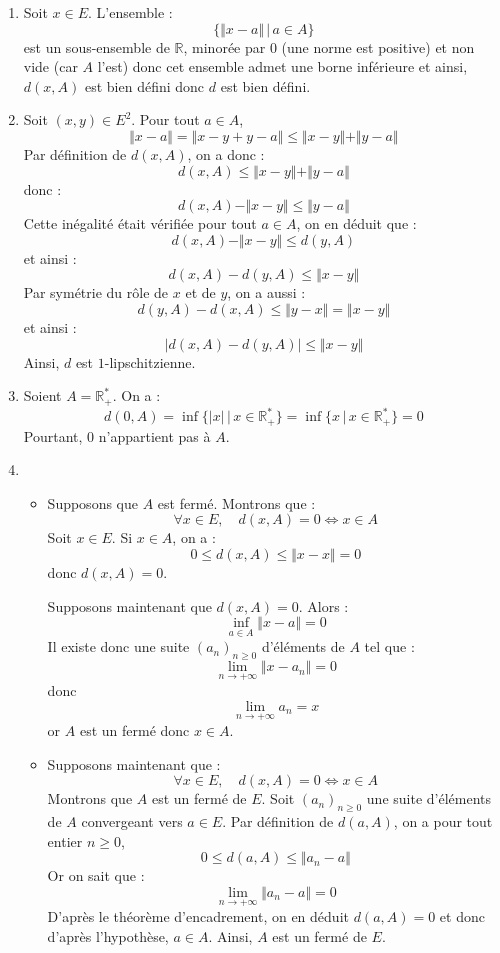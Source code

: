 \documentclass[a4paper,10pt]{report}
\begin{document}
\begin{enumerate}
\item Soit $x \in E$. L'ensemble :
$$ \lbrace \Vert x- a \Vert \, \vert \, a \in A \rbrace$$
est un sous-ensemble de $\mathbb{R}$, minorée par $0$ (une norme est positive) et non vide (car $A$ l'est) donc cet ensemble admet une borne inférieure et ainsi, $d(x,A)$ est bien défini donc $d$ est bien défini.
\item Soit $(x,y) \in E^2$. Pour tout $a \in A$,
$$ \Vert x-a \Vert = \Vert x-y+y-a \Vert \leq \Vert x-y \Vert + \Vert y-a \Vert$$
Par définition de $d(x,A)$, on a donc :
$$ d(x,A) \leq \Vert x-y \Vert + \Vert y-a \Vert$$
donc :
$$ d(x,A) - \Vert x-y \Vert \leq \Vert y-a \Vert$$
Cette inégalité était vérifiée pour tout $a \in A$, on en déduit que :
$$ d(x,A) - \Vert x-y \Vert \leq d(y,A)$$
et ainsi :
$$ d(x,A)-d(y,A) \leq \Vert x-y \Vert$$
Par symétrie du rôle de $x$ et de $y$, on a aussi :
$$  d(y,A)-d(x,A) \leq \Vert y-x \Vert = \Vert x-y \Vert$$
et ainsi :
$$ \vert d(x,A)-d(y,A) \vert \leq \Vert x-y \Vert$$
Ainsi, $d$ est $1$-lipschitzienne.
\item Soient $A= \mathbb{R}_+^{*}$. On a :
$$ d(0,A) = \inf \lbrace \vert x \vert \, \vert \, x \in \mathbb{R}_+^* \rbrace = \inf \lbrace x \, \vert \, x \in \mathbb{R}_+^* \rbrace = 0$$
Pourtant, $0$ n'appartient pas à $A$.
\item 

\begin{itemize}
\item Supposons que $A$ est fermé. Montrons que :
$$ \forall x \in E, \quad d(x,A)=0 \Longleftrightarrow x \in A $$
Soit $x \in E$. Si $x \in A$, on a :
$$ 0 \leq d(x,A) \leq \Vert x-x\Vert = 0$$
donc $d(x,A)=0$.

\medskip

\noindent Supposons maintenant que $d(x,A)=0$. Alors :
$$ \inf_{a \in A} \Vert x- a \Vert = 0$$
Il existe donc une suite $(a_n)_{n \geq 0}$ d'éléments de $A$ tel que :
$$ \lim_{n \rightarrow + \infty} \Vert x-a_n \Vert = 0$$
donc 
$$ \lim_{n \rightarrow + \infty} a_n = x$$
or $A$ est un fermé donc $x\in A$.
\item Supposons maintenant que :
$$  \forall x \in E, \quad d(x,A)=0 \Longleftrightarrow x \in A $$
Montrons que $A$ est un fermé de $E$. Soit $(a_n)_{n \geq 0}$ une suite d'éléments de $A$ convergeant vers $a \in E$. Par définition de $d(a,A)$, on a pour tout entier $n \geq 0$,
$$0 \leq d(a,A) \leq \Vert a_n -a \Vert$$
Or on sait que :
$$ \lim_{n \rightarrow + \infty} \Vert a_n -a \Vert = 0$$
D'après le théorème d'encadrement, on en déduit $d(a,A)=0$ et donc d'après l'hypothèse, $a \in A$. Ainsi, $A$ est un fermé de $E$.
\end{itemize}
\end{enumerate}
\end{document}
